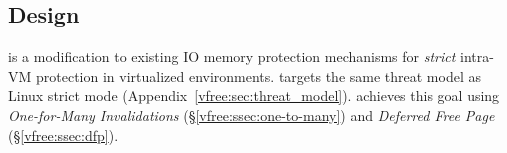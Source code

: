 \subsection{{\vfreename} Design}
\label{vfree:sec:design}
{\vfreename} is a modification to existing IO memory protection mechanisms
    for {\it strict} intra-VM protection in virtualized environments. {\vfreename} targets the same threat model as Linux strict mode (Appendix~\ref{vfree:sec:threat_model}).
{\vfreename} achieves this goal using {\em One-for-Many Invalidations} (\S\ref{vfree:ssec:one-to-many}) 
    and {\em Deferred Free Page} (\S\ref{vfree:ssec:dfp}). %







